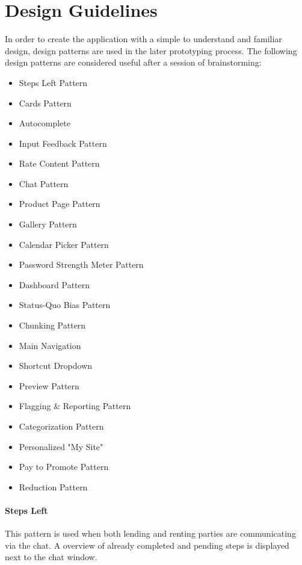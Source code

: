 \section{Design Guidelines}
	In order to create the application with a simple to understand and familiar design, design patterns are used in the later prototyping process. The following design patterns are considered useful after a session of brainstorming:
	
	\begin{itemize}
		\item Steps Left Pattern
		\item Cards Pattern
		\item Autocomplete	
		\item Input Feedback Pattern
		\item Rate Content Pattern
		\item Chat Pattern
		\item Product Page Pattern
		\item Gallery Pattern
		\item Calendar Picker Pattern
		\item Password Strength Meter Pattern
		\item Dashboard Pattern
		\item Status-Quo Bias Pattern
		\item Chunking Pattern
		\item Main Navigation
		\item Shortcut Dropdown
		
		\item Preview Pattern
		\item Flagging \& Reporting Pattern
		\item Categorization Pattern
		\item Personalized "My Site"
		\item Pay to Promote Pattern
		\item Reduction Pattern
	\end{itemize}

	\paragraph{Steps Left}
		This pattern is used when both lending and renting parties are communicating via the chat. A overview of already completed and pending steps is displayed next to the chat window.
		
